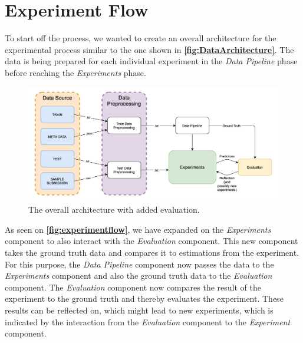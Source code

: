 \section{Experiment Flow}
To start off the process, we wanted to create an overall architecture for the experimental process similar to the one shown in \textbf{\autoref{fig:DataArchitecture}}. The data is being prepared for each individual experiment in the \textit{Data Pipeline} phase before reaching the \textit{Experiments} phase.

\begin{figure}[H]
    \centering
    \includegraphics[scale=.34]{Images/Experiments/ExperimentFlow.png}
    \caption{The overall architecture with added evaluation.}
    \label{fig:experimentflow}
\end{figure}

As seen on \textbf{\autoref{fig:experimentflow}}, we have expanded on the \textit{Experiments} component to also interact with the \textit{Evaluation} component. This new component takes the ground truth data and compares it to estimations from the experiment. For this purpose, the \textit{Data Pipeline} component now passes the data to the \textit{Experiments} component and also the ground truth data to the \textit{Evaluation} component. The \textit{Evaluation} component now compares the result of the experiment to the ground truth and thereby evaluates the experiment. These results can be reflected on, which might lead to new experiments, which is indicated by the interaction from the \textit{Evaluation} component to the \textit{Experiment} component.


